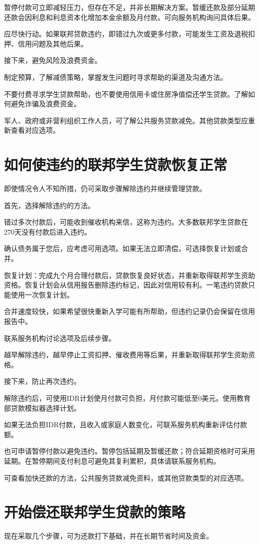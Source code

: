 \documentclass[UTF8,fontset=none,11pt,a4paper]{ctexart}
\begin{document}
暂停付款可立即减轻压力，但存在不足，并非长期解决方案。暂缓还款及部分延期还款会因利息和利息资本化增加本金余额及月付款。可向服务机构询问具体后果。


应尽快行动。如果联邦贷款违约，即错过九次或更多付款，可能发生工资及退税扣押、信用问题及其他后果。


接下来，避免风险及浪费资金。


制定预算，了解减债策略，掌握发生问题时寻求帮助的渠道及沟通方法。


不要付费寻求学生贷款帮助，也不要使用信用卡或住房净值偿还学生贷款。了解如何避免诈骗及浪费资金。


军人、政府或非营利组织工作人员，可了解公共服务贷款减免。其他贷款类型应重新查看对应选项。


\section*{如何使违约的联邦学生贷款恢复正常}
即使情况令人不知所措，仍可采取步骤解除违约并继续管理贷款。


首先，选择解除违约的方法。


错过多次付款后，可能收到催收机构来信，这称为违约。大多数联邦学生贷款在270天没有付款后进入违约。


确认债务属于您后，应考虑可用选项。如果无法立即清偿，可选择恢复计划或合并。


恢复计划：完成九个月合理付款后，贷款恢复良好状态，并重新取得联邦学生资助资格。恢复计划会从信用报告删除违约标记，因此对信用较有利。一笔违约贷款只能使用一次恢复计划。


合并速度较快，如果希望很快重新入学可能有所帮助，但违约记录仍会保留在信用报告中。


联系服务机构讨论选项及后续步骤。


越早解除违约，越早停止工资扣押、催收费用等后果，并重新取得联邦学生资助资格。


接下来，防止再次违约。


解除违约后，可使用IDR计划使月付款可负担，月付款可能低至0美元。使用教育部贷款模拟器选择计划。


如果无法负担IDR付款，且收入或家庭人数变化，可联系服务机构重新评估付款额。


也可申请暂停付款以避免违约。暂停包括延期及暂缓还款；符合延期资格时可采用延期。在暂停期间支付利息可避免其复利累积，具体请联系服务机构。


可查看加快还款的方法，公共服务贷款减免资料，或其他贷款类型的对应选项。


\section*{开始偿还联邦学生贷款的策略}
现在采取几个步骤，可为还款打下基础，并在长期节省时间及资金。
\end{document}
